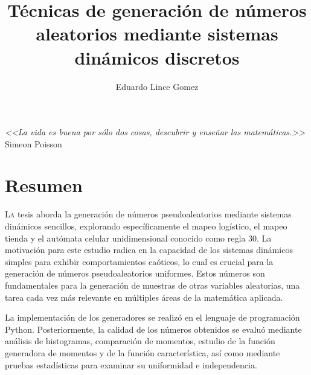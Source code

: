 \documentclass[letterpaper,spanish,12pt]{book}
\author{Eduardo Lince Gomez}
\title{Técnicas de generación
de números aleatorios mediante sistemas dinámicos discretos}
\newcommand{\chapteropening}[3][]{%
  \lettrine[lines=1, lhang=0.25, nindent=8pt, lraise=0., #1]{#2}{\MakeLowercase{#3}}%
}
\begin{document}
\frontmatter
\maketitle %

\chapter*{}
\begin{flushright}
	{%
	\selectfont\emph{<<La vida es buena por sólo dos cosas, descubrir y enseñar las matemáticas.>>}\\
\vspace{5mm}
	Simeon Poisson}

\end{flushright}
\vfill
\chapter{Resumen}
\chapteropening{L}{a} tesis aborda la generación de números pseudoaleatorios mediante sistemas dinámicos sencillos, explorando específicamente el mapeo logístico, el mapeo tienda y el autómata celular unidimensional conocido como regla 30. La motivación para este estudio radica en la  capacidad de los sistemas dinámicos simples para exhibir comportamientos caóticos, lo cual es crucial para la generación de números pseudoaleatorios uniformes. Estos números son fundamentales para la generación de muestras de otras variables aleatorias, una tarea cada vez más relevante en múltiples áreas de la matemática aplicada.

La implementación de los generadores se realizó en el lenguaje de programación Python. Posteriormente, la calidad de los números obtenidos se evaluó mediante análisis de histogramas, comparación de momentos, estudio de la función generadora de momentos y de la función característica, así como mediante pruebas estadísticas para examinar su uniformidad e independencia.
\end{document}
